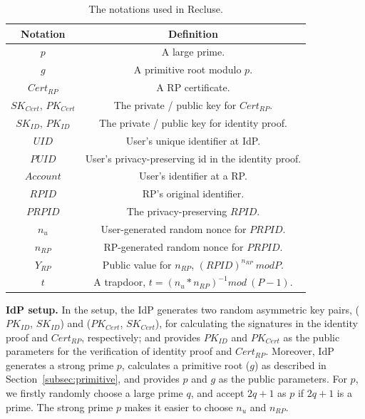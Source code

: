 \begin{table}[tb]
    \caption{The notations used in Recluse.}
    \centering
    \begin{tabular}{|c|c|}
    \hline
    {Notation} & {Definition} \\
    \hline
    {$p$} & {A large prime.} \\
    \hline
    {$g$} & {A primitive root  modulo $p$.} \\
    \hline
    {$Cert_{RP}$} & {A RP certificate.} \\
    \hline
    {$SK_{Cert}$, $PK_{Cert}$} & {The private / public key for $Cert_{RP}$.} \\
    \hline
    {$SK_{ID}$, $PK_{ID}$} & {The private / public key for  identity proof.} \\
    \hline
    {$UID$} & {User's unique identifier at IdP.} \\
    \hline
    {$PUID$} & {User's privacy-preserving id in the identity proof.} \\
    \hline
    {$Account$} & {User's identifier at a RP.} \\
    \hline
    {$RPID$} & {RP's original identifier.} \\
    \hline
    {$PRPID$} & {The privacy-preserving $RPID$.} \\
    \hline
    {$n_u$} & {User-generated random nonce for $PRPID$. } \\
    \hline
    {$n_{RP}$} & {RP-generated random nonce for $PRPID$. } \\
    \hline
    {$Y_{RP}$} & {Public value for $n_{RP}$, $(RPID)^{n_{RP}} \ mod P$. } \\
    \hline
    {$t$} & {A trapdoor, $t=(n_u*n_{RP})^{-1} mod \ (P-1)$. } \\
    \hline
    \end{tabular}
    \label{tbl:notations}
\end{table}

\noindent\textbf{IdP setup.} In the setup, the IdP generates two random asymmetric key pairs, ($PK_{ID}$, $SK_{ID}$) and ($PK_{Cert}$, $SK_{Cert}$), for calculating the signatures in the identity proof and $Cert_{RP}$, respectively; and provides $PK_{ID}$ and $PK_{Cert}$ as the public parameters for the verification of identity proof and $Cert_{RP}$. Moreover, IdP generates a strong prime $p$, calculates  a primitive root ($g$) as described in Section~\ref{subsec:primitive}, and provides $p$ and $g$ as the public parameters. For $p$, we firstly randomly choose a large prime $q$, and accept  $2q+1$ as $p$ if $2q+1$ is a prime. The strong prime $p$ makes it easier to choose $n_{u}$ and $n_{RP}$. %

